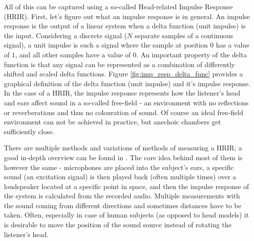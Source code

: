 All of this can be captured using a so-called Head-related Impulse Response (HRIR).
First, let's figure out what an impulse response is in general. An impulse response is the output of a linear system when a delta function 
(unit impulse) is the input.
Considering a discrete signal ($N$ separate samples of a continuous signal),
a unit impulse is such a signal where the sample at position $0$ has a value of $1$, and all other samples have a value of $0$.
An important property of the delta function is that any signal can be represented as a combination of differently
shifted and scaled delta functions.\cite{dsp_book_convolution}
Figure \ref{fig:imp_resp_delta_func} provides a graphical definition of the delta function (unit impulse) and it's impulse response.
In the case of a HRIR, the impulse response represents how the listener's head and ears affect sound in a so-called free-field 
- an environment with no reflections or reverberations and thus no colouration of sound.\cite{fundamentals_of_binaural_technology}
Of course an ideal free-field environment can not be achieved in practice, but anechoic chambers get sufficiently close.

There are multiple methods and variations of methods of measuring a HRIR; a good in-depth overview can be found in \cite{hrtf_measurement_review}.
The core idea behind most of them is however the same - microphones are placed into the subject's ears, 
a specific sound (an excitation signal) is then played back (often multiple times)
over a loudspeaker located at a specific point in space, and then the impulse response 
of the system is calculated from the recorded audio.
Multiple measurements with the sound coming from different directions and sometimes distances have to be taken.
Often, especially in case of human subjects (as opposed to head models) it is desirable to move the position of the sound source instead of rotating the listener's head. 


